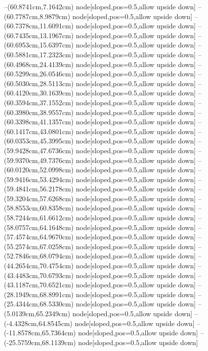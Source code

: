--(60.8741cm,7.1642cm) node[sloped,pos=0.5,allow upside down]{\ArrowIn}
--(60.7787cm,8.9879cm) node[sloped,pos=0.5,allow upside down]{\ArrowIn}
--(60.7378cm,11.6091cm) node[sloped,pos=0.5,allow upside down]{\ArrowIn}
--(60.7435cm,13.1967cm) node[sloped,pos=0.5,allow upside down]{\ArrowIn}
--(60.6953cm,15.6397cm) node[sloped,pos=0.5,allow upside down]{\ArrowIn}
--(60.5881cm,17.2323cm) node[sloped,pos=0.5,allow upside down]{\ArrowIn}
--(60.4968cm,24.4139cm) node[sloped,pos=0.5,allow upside down]{\ArrowIn}
--(60.5299cm,26.0546cm) node[sloped,pos=0.5,allow upside down]{\ArrowIn}
--(60.5030cm,28.5113cm) node[sloped,pos=0.5,allow upside down]{\ArrowIn}
--(60.4120cm,30.1639cm) node[sloped,pos=0.5,allow upside down]{\ArrowIn}
--(60.3594cm,37.1552cm) node[sloped,pos=0.5,allow upside down]{\ArrowIn}
--(60.3980cm,38.9557cm) node[sloped,pos=0.5,allow upside down]{\ArrowIn}
--(60.3398cm,41.1357cm) node[sloped,pos=0.5,allow upside down]{\ArrowIn}
--(60.1417cm,43.0801cm) node[sloped,pos=0.5,allow upside down]{\ArrowIn}
--(60.0353cm,45.3995cm) node[sloped,pos=0.5,allow upside down]{\ArrowIn}
--(59.9428cm,47.6736cm) node[sloped,pos=0.5,allow upside down]{\ArrowIn}
--(59.9370cm,49.7376cm) node[sloped,pos=0.5,allow upside down]{\ArrowIn}
--(60.0120cm,52.0998cm) node[sloped,pos=0.5,allow upside down]{\ArrowIn}
--(59.9416cm,53.4294cm) node[sloped,pos=0.5,allow upside down]{\ArrowIn}
--(59.4841cm,56.2178cm) node[sloped,pos=0.5,allow upside down]{\ArrowIn}
--(59.3204cm,57.6268cm) node[sloped,pos=0.5,allow upside down]{\ArrowIn}
--(58.8553cm,60.8358cm) node[sloped,pos=0.5,allow upside down]{\ArrowIn}
--(58.7244cm,61.6612cm) node[sloped,pos=0.5,allow upside down]{\arrowIn}
--(58.0757cm,64.1648cm) node[sloped,pos=0.5,allow upside down]{\ArrowIn}
--(57.4574cm,64.9670cm) node[sloped,pos=0.5,allow upside down]{\ArrowIn}
--(55.2574cm,67.0258cm) node[sloped,pos=0.5,allow upside down]{\ArrowIn}
--(52.7846cm,68.0794cm) node[sloped,pos=0.5,allow upside down]{\ArrowIn}
--(44.2654cm,70.4754cm) node[sloped,pos=0.5,allow upside down]{\ArrowIn}
--(43.4483cm,70.6793cm) node[sloped,pos=0.5,allow upside down]{\arrowIn}
--(43.1187cm,70.6521cm) node[sloped,pos=0.5,allow upside down]{\arrowIn}
--(28.1949cm,68.8991cm) node[sloped,pos=0.5,allow upside down]{\ArrowIn}
--(25.4344cm,68.5330cm) node[sloped,pos=0.5,allow upside down]{\ArrowIn}
--(5.0139cm,65.2349cm) node[sloped,pos=0.5,allow upside down]{\ArrowIn}
--(-4.4328cm,64.8545cm) node[sloped,pos=0.5,allow upside down]{\ArrowIn}
--(-11.8578cm,65.7364cm) node[sloped,pos=0.5,allow upside down]{\ArrowIn}
--(-25.5759cm,68.1139cm) node[sloped,pos=0.5,allow upside down]{\ArrowIn}
